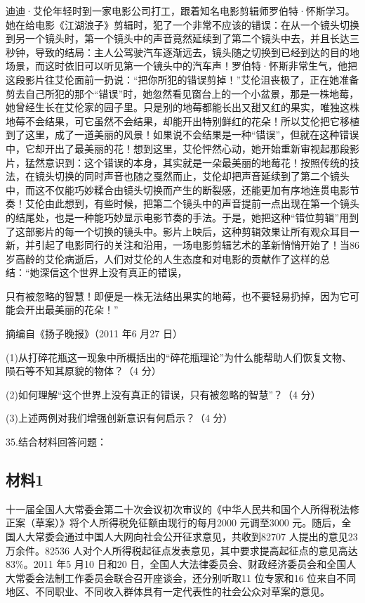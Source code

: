 \documentclass[UTF8,11pt]{ctexart}
\begin{document}
迪迪·艾伦年轻时到一家电影公司打工，跟着知名电影剪辑师罗伯特·怀斯学习。她在给电影《江湖浪子》剪辑时，犯了一个非常不应该的错误：在从一个镜头切换到另一个镜头时，第一个镜头中的声音竟然延续到了第二个镜头中去，并且长达三秒钟，导致的结局：主人公驾驶汽车逐渐远去，镜头随之切换到已经到达的目的地场景，而这时依旧可以听见第一个镜头中的汽车声！罗伯特·怀斯非常生气，他把这段影片往艾伦面前一扔说：“把你所犯的错误剪掉！”艾伦沮丧极了，正在她准备剪去自己所犯的那个“错误”时，她忽然看见窗台上的一个小盆景，那是一株地莓，她曾经生长在艾伦家的园子里。只是别的地莓都能长出又甜又红的果实，唯独这株地莓不会结果，可它虽然不会结果，却能开出特别鲜红的花朵！所以艾伦把它移植到了这里，成了一道美丽的风景！如果说不会结果是一种“错误”，但就在这种错误中，它却开出了最美丽的花！想到这里，艾伦怦然心动，她开始重新审视起那段影片，猛然意识到：这个错误的本身，其实就是一朵最美丽的地莓花！按照传统的技法，在镜头切换的同时声音也随之戛然而止，艾伦却把声音延续到了第二个镜头中，而这不仅能巧妙糅合由镜头切换而产生的断裂感，还能更加有序地连贯电影节奏！艾伦由此想到，有些时候，把第二个镜头中的声音提前一点出现在第一个镜头的结尾处，也是一种能巧妙显示电影节奏的手法。于是，她把这种“错位剪辑”用到了这部影片的每一个切换的镜头中。影片上映后，这种剪辑效果让所有观众耳目一新，并引起了电影同行的关注和沿用，一场电影剪辑艺术的革新悄悄开始了！当86 岁高龄的艾伦病逝后，人们对艾伦的人生态度和对电影的贡献作了这样的总结：“她深信这个世界上没有真正的错误，


只有被忽略的智慧！即便是一株无法结出果实的地莓，也不要轻易扔掉，因为它可能会开出最美丽的花朵！”

摘编自《扬子晚报》（2011 年6 月27 日）

(1)从打碎花瓶这一现象中所概括出的“碎花瓶理论”为什么能帮助人们恢复文物、陨石等不知其原貌的物体？（4 分）


(2)如何理解“这个世界上没有真正的错误，只有被忽略的智慧”？（4 分）


(3)上述两例对我们增强创新意识有何启示？（4 分）


35.结合材料回答问题：


\subsection*{材料1}

十一届全国人大常委会第二十次会议初次审议的《中华人民共和国个人所得税法修正案（草案）》将个人所得税免征额由现行的每月2000 元调至3000 元。随后，全国人大常委会通过中国人大网向社会公开征求意见，共收到82707 人提出的意见23 万余件。82536 人对个人所得税起征点发表意见，其中要求提高起征点的意见高达83\%。2011 年5 月10 日和20 日，全国人大法律委员会、财政经济委员会和全国人大常委会法制工作委员会联合召开座谈会，还分别听取11 位专家和16 位来自不同地区、不同职业、不同收入群体具有一定代表性的社会公众对草案的意见。
\end{document}

